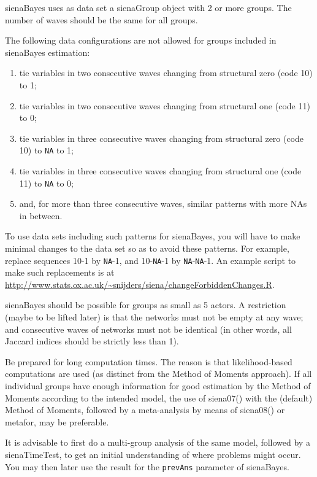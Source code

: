 \documentclass[a4paper,fleqn,11pt]{article}
\newcommand{\+}{\, + \,}
\newcommand{\sfn}[1]{\textsf{#1}}
\begin{document}
\sfn{sienaBayes} uses as data set a \sfn{sienaGroup} object with 2 or more groups.
The number of waves should be the same for all groups.

The following data configurations are not allowed for groups
included in \sfn{sienaBayes} estimation:
\begin{enumerate}
\item tie variables in two consecutive waves changing from
    structural zero (code 10) to 1;
\item tie variables in two consecutive waves changing from
    structural one (code 11) to 0;
\item tie variables in three consecutive waves changing from
    structural zero (code 10) to \texttt{NA} to 1;
\item tie variables in three consecutive waves changing from
    structural one (code 11) to \texttt{NA} to 0;
\item and, for more than three consecutive waves, similar patterns
    with more NAs in between.
\end{enumerate}
To use data sets including such patterns for \sfn{sienaBayes},
you will have to make minimal changes to the data set
so as to avoid these patterns.
For example, replace sequences 10-1 by \texttt{NA}-1,
and 10-\texttt{NA}-1 by \texttt{NA}-\texttt{NA}-1.
An example script to make such replacements is at
{\small{\url{http://www.stats.ox.ac.uk/~snijders/siena/changeForbiddenChanges.R}}}.

\sfn{sienaBayes} should be possible for groups as small as 5 actors.
A restriction (maybe to be lifted later) is that the networks must not be
empty at any wave; and consecutive waves of networks must not be identical
(in other words, all Jaccard indices should be strictly less than 1).

Be prepared for long computation times. The reason is that likelihood-based
computations are used (as distinct from the Method of Moments approach).
If all individual groups have enough information for good estimation by
the Method of Moments according to the intended model,
the use of \sfn{siena07()} with the (default) Method of Moments, followed by a
meta-analysis by means of \sfn{siena08()} or \sfn{metafor}, may be preferable.

It is advisable to first do a multi-group analysis of the same model,
followed by a \sfn{sienaTimeTest}, to get an initial understanding of where problems
might occur. You may then later use the result for the \texttt{prevAns}
parameter of \sfn{sienaBayes}.
\end{document}
